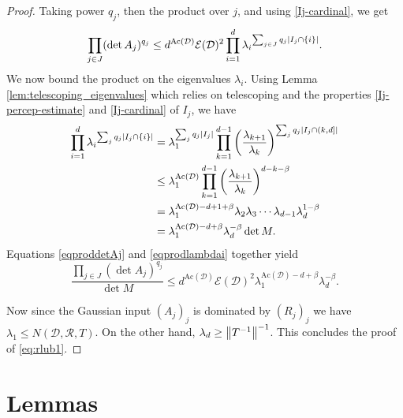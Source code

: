 \begin{proof}
Taking power $q_{j}$, then the product over $j$, and using \eqref{Ij-cardinal}, we get
\begin{equation} \label{eqproddetAj}
\prod_{j\in J} (\det A_{j})^{q_{j}} \leq
d^{\mathrm{Ac}(\mathcal{D})}\mathcal{E}(\mathcal{D})^2
\prod_{i=1}^d{\lambda_{i}}^{\sum_{j \in J} q_{j}\left\lvert I_{j}\cap \{i\}\right\rvert}.
\end{equation}
We now bound the product on the eigenvalues $\lambda_{i}$.
Using Lemma \ref{lem:telescoping_eigenvalues} which relies on telescoping and the properties \eqref{Ij-percep-estimate} and \eqref{Ij-cardinal} of $I_{j}$, we have
\begin{align}
 \prod_{i=1}^d{\lambda_{i}}^{\sum_{j}q_{j}\left\lvert I_{j} \cap \{i\}\right\rvert}
 &= \lambda_{1}^{\sum_{j}q_{j}\left\lvert I_j\right\rvert}\prod_{k=1}^{d-1} \left(\frac{\lambda_{k+1}}{\lambda_k}\right)^{\sum_{j}q_{j}\left\lvert I_{j}\cap (k,d]\right\rvert } \nonumber\\
 &\leq \lambda_{1}^{\mathrm{Ac}(\mathcal{D})}\prod_{k=1}^{d-1} \left(\frac{\lambda_{k+1}}{\lambda_k}\right)^{d-k-\beta} \nonumber\\
 &=\lambda_{1}^{\mathrm{Ac}(\mathcal{D})-d+1+\beta} \lambda_{2}\lambda_{3}\dotsm \lambda_{d-1} \lambda_{d}^{1-\beta} \nonumber\\
 &= \lambda_{1}^{\mathrm{Ac}(\mathcal{D})-d+\beta} \lambda_{d}^{-\beta}  \det M. \label{eqprodlambdai}
 \end{align}
Equations \eqref{eqproddetAj} and \eqref{eqprodlambdai} together yield
$$
\frac{\prod_{j\in J} (\det A_{j})^{q_{j}} }{{\det M}}\leq d^{\mathrm{Ac}(\mathcal{D})}\mathcal{E}(\mathcal{D})^2
\lambda_{1}^{\mathrm{Ac}(\mathcal{D})-d+\beta} \lambda_{d}^{-\beta}.
$$

Now since the Gaussian input $(A_j)_j$ is dominated by $(R_j)_j$
we have $\lambda_{1}\leq N(\mathcal{D}, \mathcal{R}, T)$.
On the other hand, $\lambda_{d} \geq \left\lVert T^{-1} \right\rVert^{-1}$.
This concludes the proof of \eqref{eq:rlub1}.
\end{proof}

\section{Lemmas}

